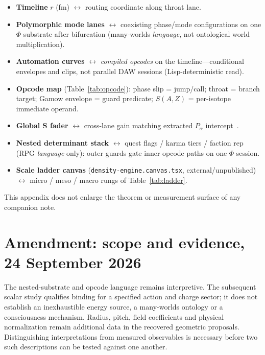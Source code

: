\documentclass[11pt,a4paper]{article}
\theoremstyle{remark}
\theoremstyle{definition}
\begin{document}
\begin{itemize}[leftmargin=1.3em,itemsep=2pt]
  \item \textbf{Timeline} $r$ (fm) $\leftrightarrow$ routing coordinate along
        throat lane.
  \item \textbf{Polymorphic mode lanes} $\leftrightarrow$ coexisting
        phase/mode configurations on one $\Phi$ substrate after bifurcation
        (many-worlds \emph{language}, not ontological world multiplication).
  \item \textbf{Automation curves} $\leftrightarrow$ \emph{compiled opcodes}
        on the timeline---conditional envelopes and clips, not parallel DAW
        sessions (Lisp-deterministic read).
  \item \textbf{Opcode map} (Table~\ref{tab:opcode}): phase slip = jump/call;
        throat = branch target; Gamow envelope = guard predicate;
        $S(A,Z)$ = per-isotope immediate operand.
  \item \textbf{Global S fader} $\leftrightarrow$ cross-lane gain matching
        extracted $P_\alpha$ intercept~\cite{PalphaRefined2026}.
  \item \textbf{Nested determinant stack} $\leftrightarrow$ quest flags /
        karma tiers / faction rep (RPG \emph{language} only): outer guards
        gate inner opcode paths on one $\Phi$ session.
  \item \textbf{Scale ladder canvas} (\texttt{density-engine.canvas.tsx},
        external/unpublished) $\leftrightarrow$ micro / meso / macro rungs of
        Table~\ref{tab:ladder}.
\end{itemize}

This appendix does not enlarge the theorem or measurement surface of any
companion note.


\section*{Amendment: scope and evidence, 24 September 2026}
The nested-substrate and opcode language remains interpretive. The subsequent scalar study qualifies binding for a specified action and charge sector; it does not establish an inexhaustible energy source, a many-worlds ontology or a consciousness mechanism. Radius, pitch, field coefficients and physical normalization remain additional data in the recovered geometric proposals. Distinguishing interpretations from measured observables is necessary before two such descriptions can be tested against one another.
\end{document}

